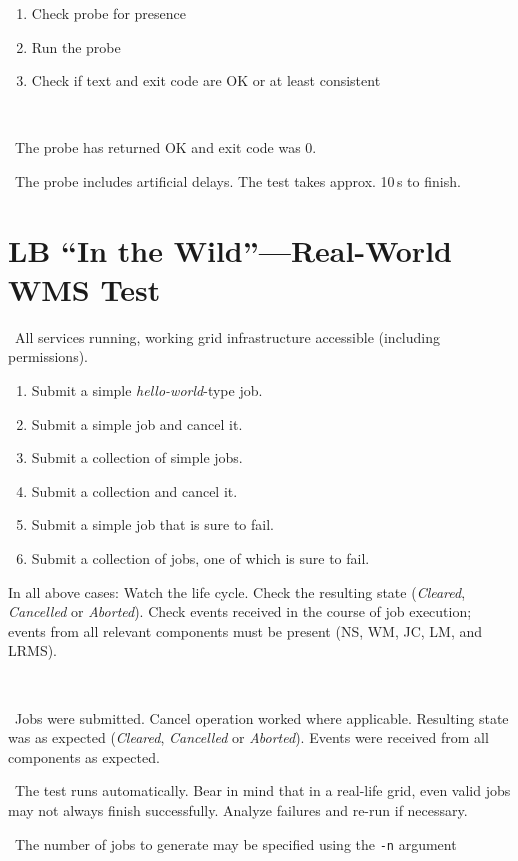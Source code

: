 \what
\begin{enumerate}
\item Check probe for presence
\item Run the probe
\item Check if text and exit code are OK or at least consistent
\end{enumerate}

\how\ 

\result\ The probe has returned OK and exit code was 0.

\note\ The probe includes artificial delays. The test takes approx. 10\,s to finish.


\section{LB ``In the Wild''---Real-World WMS Test}
\req\ All \LB services running, working grid infrastructure accessible (including permissions). 

\what
\begin{enumerate}
\item Submit a simple \emph{hello-world}-type job.
\item Submit a simple job and cancel it.
\item Submit a collection of simple jobs.
\item Submit a collection and cancel it. 
\item Submit a simple job that is sure to fail.
\item Submit a collection of jobs, one of which is sure to fail. 
\end{enumerate}

In all above cases: Watch the life cycle. Check the resulting state (\emph{Cleared}, \emph{Cancelled} or \emph{Aborted}). Check events received in the course of job execution; events from all relevant components must be present (NS, WM, JC, LM, and LRMS). 

\how\ 

\result\ Jobs were submitted. Cancel operation worked where applicable. Resulting state was as expected (\emph{Cleared}, \emph{Cancelled} or \emph{Aborted}). Events were received from all components as expected.

\note\ The test runs automatically. Bear in mind that in a real-life grid, even valid jobs may not always finish successfully. Analyze failures and re-run if necessary.

\note\ The number of jobs to generate may be specified using the \texttt{-n} argument


